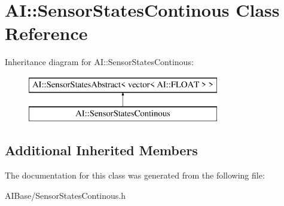 \hypertarget{classAI_1_1SensorStatesContinous}{\section{A\-I\-:\-:Sensor\-States\-Continous Class Reference}
\label{classAI_1_1SensorStatesContinous}
}
Inheritance diagram for A\-I\-:\-:Sensor\-States\-Continous\-:\begin{figure}[H]
\begin{center}
\leavevmode
\includegraphics[height=2.000000cm]{classAI_1_1SensorStatesContinous}
\end{center}
\end{figure}
\subsection*{Additional Inherited Members}


The documentation for this class was generated from the following file\-:\begin{DoxyCompactItemize}
\item 
A\-I\-Base/Sensor\-States\-Continous.\-h\end{DoxyCompactItemize}
